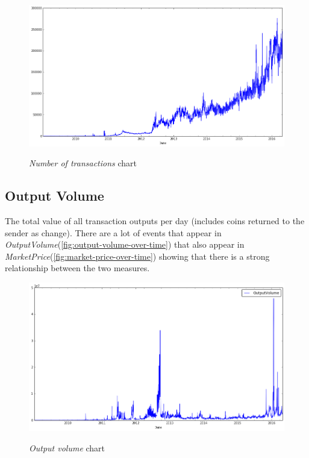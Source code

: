 \begin{figure}[bth]
  \myfloatalign
  {\includegraphics[width=1\linewidth]
    {gfx/n-transactions-over-time}}
  \caption{\textit{Number of transactions} chart}
  \label{fig:n-transactions-over-time}
\end{figure}


\subsection{Output Volume}
\label{sec:output-volume}

The total value of all transaction outputs per day (includes coins
returned to the sender as change). There are a lot of events that
appear in \textit{OutputVolume}(\autoref{fig:output-volume-over-time})
that also appear in
\textit{MarketPrice}(\autoref{fig:market-price-over-time}) showing
that there is a strong relationship between the two measures.

\begin{figure}[bth]
  \myfloatalign
  {\includegraphics[width=1\linewidth]
    {gfx/output-volume-over-time}}
  \caption{\textit{Output volume} chart}
  \label{fig:output-volume-over-time}
\end{figure}

